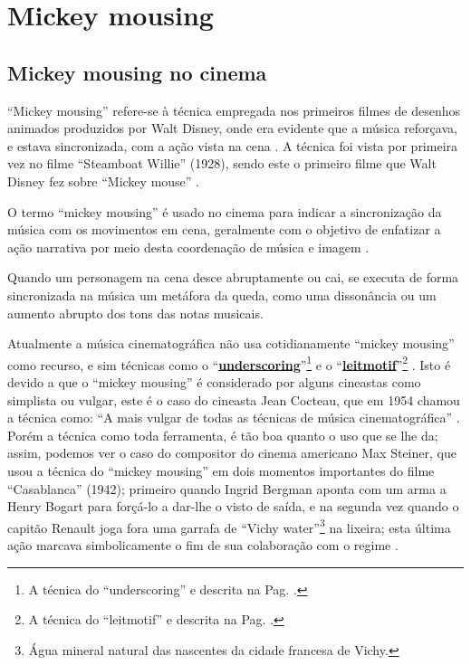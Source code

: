

\section{Mickey mousing}
\label{sec:mikeymousing}


\subsection{Mickey mousing no cinema}

``Mickey mousing'' refere-se à técnica empregada nos primeiros filmes de desenhos animados produzidos por Walt Disney,
onde era evidente que a música reforçava, e estava sincronizada, 
com a ação vista na cena \cite{butterworth2011dance} \cite[pp. 62]{kalinak2010film}.
A técnica foi vista por primeira vez no filme ``Steamboat Willie'' (1928),
sendo este o primeiro filme que Walt Disney fez sobre ``Mickey mouse'' \cite[pp. 37]{wegele2014max}.

O termo ``mickey mousing'' é usado no cinema para indicar a sincronização da música com os movimentos em cena,
geralmente com o objetivo de enfatizar a ação narrativa por meio desta coordenação de música e imagem
  \cite{butterworth2011dance} \cite[pp. 62]{kalinak2010film}.


\begin{example}
Quando um personagem na cena desce abruptamente ou cai, 
se executa  de forma sincronizada na música um metáfora da queda,
como uma dissonância ou um aumento abrupto dos tons das notas musicais.
\end{example}

Atualmente a música cinematográfica não usa cotidianamente ``mickey mousing'' como recurso,
e sim técnicas como o ``\hyperref[ref:Underscoring]{\textbf{underscoring}}''\footnote{
A técnica do ``underscoring'' e descrita na Pag. \pageref{ref:Underscoring}.} e 
o ``\hyperref[subsec:LeitmotivCine]{\textbf{leitmotif}}''\footnote{
A técnica do ``leitmotif'' e descrita na Pag. \pageref{subsec:LeitmotivCine}.} \cite[pp. 37]{wegele2014max}.
Isto é devido a que o ``mickey mousing'' é considerado por alguns cineastas como simplista ou vulgar,
este é o caso do cineasta Jean Cocteau, que em 1954 chamou a técnica como: ``A mais vulgar de todas as técnicas de música cinematográfica'' \cite[pp. 37]{wegele2014max}.
Porém a técnica como toda ferramenta, é tão boa quanto o uso que se lhe da;
assim, podemos ver o caso do compositor do cinema americano Max Steiner,
que usou a técnica do ``mickey mousing'' em dois momentos importantes do filme ``Casablanca'' (1942);
primeiro quando Ingrid Bergman aponta com um arma a Henry Bogart para forçá-lo a dar-lhe o visto de saída,
e na segunda vez quando o capitão Renault joga fora uma garrafa de 
``Vichy water''\footnote{Água mineral natural das nascentes da cidade francesa de Vichy.} na lixeira;
esta última ação marcava simbolicamente o fim de sua colaboração com o regime \cite[pp. 38]{wegele2014max}.



